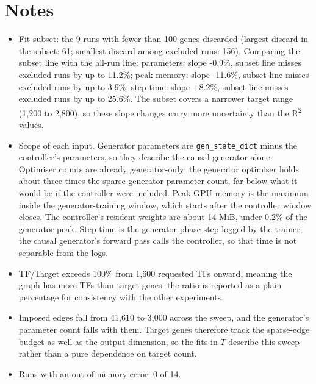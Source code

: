 \documentclass[11pt]{article}
\begin{document}
\section{Notes}
\begin{itemize}
\item Fit subset: the 9 runs with fewer than 100 genes discarded (largest discard in the subset: 61; smallest discard among excluded runs: 156). Comparing the subset line with the all-run line: parameters: slope -0.9\%, subset line misses excluded runs by up to 11.2\%; peak memory: slope -11.6\%, subset line misses excluded runs by up to 3.9\%; step time: slope +8.2\%, subset line misses excluded runs by up to 25.6\%. The subset covers a narrower target range (1,200 to 2,800), so these slope changes carry more uncertainty than the R\textsuperscript{2} values.
\item Scope of each input. Generator parameters are \texttt{gen\_state\_dict} minus the controller's parameters, so they describe the causal generator alone. Optimiser counts are already generator-only: the generator optimiser holds about three times the sparse-generator parameter count, far below what it would be if the controller were included. Peak GPU memory is the maximum inside the generator-training window, which starts after the controller window closes. The controller's resident weights are about 14 MiB, under 0.2\% of the generator peak. Step time is the generator-phase step logged by the trainer; the causal generator's forward pass calls the controller, so that time is not separable from the logs.
\item TF/Target exceeds 100\% from 1{,}600 requested TFs onward, meaning the graph has more TFs than target genes; the ratio is reported as a plain percentage for consistency with the other experiments.
\item Imposed edges fall from 41{,}610 to 3{,}000 across the sweep, and the generator's parameter count falls with them. Target genes therefore track the sparse-edge budget as well as the output dimension, so the fits in $T$ describe this sweep rather than a pure dependence on target count.
\item Runs with an out-of-memory error: 0 of 14.
\end{itemize}
\end{document}
